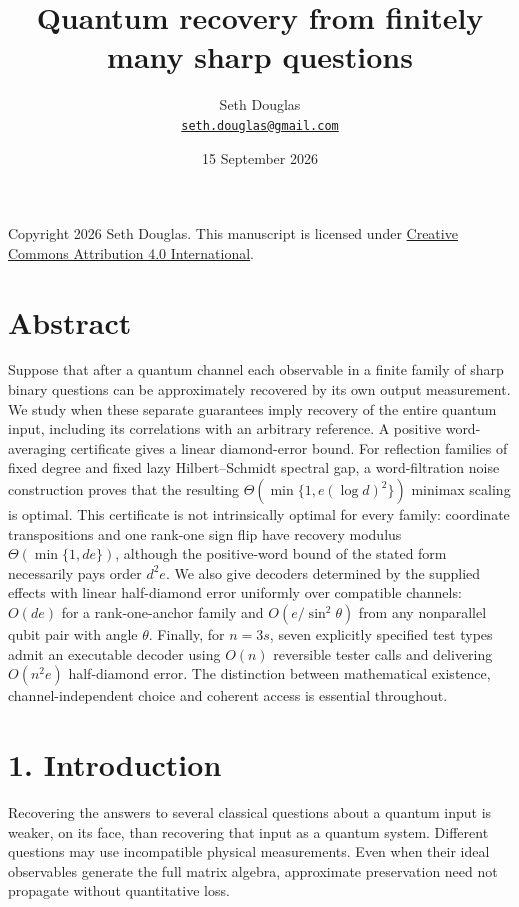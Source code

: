 \documentclass[11pt]{article}
\title{Quantum recovery from finitely many sharp questions}
\author{Seth Douglas\\\small\href{mailto:seth.douglas@gmail.com}{\texttt{seth.douglas@gmail.com}}}
\date{15 September 2026}
\begin{document}
\maketitle
Copyright 2026 Seth Douglas. This manuscript is licensed under
\href{https://creativecommons.org/licenses/by/4.0/}{Creative Commons Attribution 4.0 International}.

\section*{Abstract}

Suppose that after a quantum channel each observable in a finite family of
sharp binary questions can be approximately recovered by its own output
measurement. We study when these separate guarantees imply recovery of the
entire quantum input, including its correlations with an arbitrary reference.
A positive word-averaging certificate gives a linear diamond-error bound.
For reflection families of fixed degree and fixed lazy Hilbert--Schmidt spectral
gap, a word-filtration noise construction proves that the resulting
\(\Theta(\min\{1,e(\log d)^2\})\) minimax scaling is optimal. This certificate is
not intrinsically optimal for every family: coordinate transpositions and
one rank-one sign flip have recovery modulus \(\Theta(\min\{1,de\})\), although
the positive-word bound of the stated form necessarily pays order \(d^2e\).
We also give decoders determined by the supplied effects with linear
half-diamond error uniformly over compatible channels: \(O(de)\) for a
rank-one-anchor family and \(O(e/\sin^2\theta)\) from any nonparallel qubit pair
with angle \(\theta\). Finally, for \(n=3s\), seven explicitly specified test types admit an
executable decoder using \(O(n)\) reversible tester calls and delivering
\(O(n^2e)\) half-diamond error. The distinction between mathematical existence,
channel-independent choice and coherent access is essential throughout.

\section*{1. Introduction}

Recovering the answers to several classical questions about a quantum input
is weaker, on its face, than recovering that input as a quantum system.
Different questions may use incompatible physical measurements. Even when
their ideal observables generate the full matrix algebra, approximate
preservation need not propagate without quantitative loss.
\end{document}
